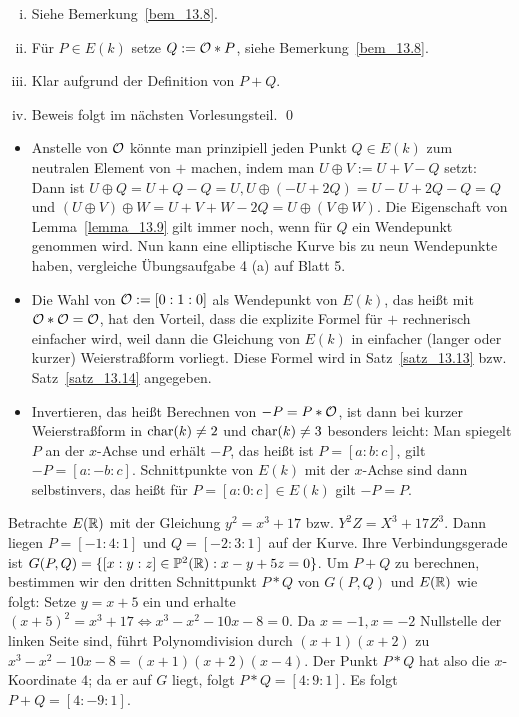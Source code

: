 	\begin{enumerate}[(i)]
		\item Siehe Bemerkung~\ref{bem_13.8}.
		\item Für $P \in E(k)$ setze $Q := \mathcal{O} * P$, siehe Bemerkung~\ref{bem_13.8}.
		\item Klar aufgrund der Definition von $P+Q$.
		\item Beweis folgt im nächsten Vorlesungsteil. \qed
	\end{enumerate}
	
\begin{bem}
	\begin{itemize}
		\item Anstelle von $\mathcal{O}$ könnte man prinzipiell jeden Punkt $Q \in E(k)$ zum neutralen Element von $+$ machen, indem man $U \oplus V := U + V - Q$ setzt: Dann ist $U \oplus Q = U + Q - Q = U, U \oplus(-U+2Q) = U-U+2Q-Q = Q$ und $(U \oplus V) \oplus W = U + V + W - 2Q = U \oplus (V \oplus W)$. 
		Die Eigenschaft von Lemma~\ref{lemma_13.9} gilt immer noch, wenn für $Q$ ein Wendepunkt genommen wird. 
		Nun kann eine elliptische Kurve bis zu neun Wendepunkte haben, vergleiche Übungsaufgabe 4 (a) auf Blatt 5.
		\item Die Wahl von $\mathcal{O} := [0:1:0]$ als Wendepunkt von $E(k)$, das heißt mit $\mathcal{O} * \mathcal{O} = \mathcal{O}$, hat den Vorteil, dass die explizite Formel für $+$ rechnerisch einfacher wird, weil dann die Gleichung von $E(k)$ in einfacher (langer oder kurzer) Weierstraßform vorliegt. 
		Diese Formel wird in Satz~\ref{satz_13.13} bzw. Satz~\ref{satz_13.14} angegeben.
		\item Invertieren, das heißt Berechnen von $-P = P * \mathcal{O}$, ist dann bei kurzer Weierstraßform in $\operatorname{char}(k) \neq 2$ und $\operatorname{char}(k) \neq 3$ besonders leicht: Man spiegelt $P$ an der $x$-Achse und erhält $-P$, das heißt ist $P = [a:b:c]$, gilt $-P = [a:-b:c]$. 
		Schnittpunkte von $E(k)$ mit der $x$-Achse sind dann selbstinvers, das heißt für $P = [a:0:c] \in E(k)$ gilt $-P = P$.
	\end{itemize}
\end{bem}

\begin{bsp}
	Betrachte $E(\mathbb{R})$ mit der Gleichung $y^2 = x^3 + 17$ bzw. $Y^2Z = X^3 + 17Z^3$. 
	Dann liegen $P = [-1:4:1]$ und $Q = [-2:3:1]$ auf der Kurve. 
	Ihre Verbindungsgerade ist $G(P,Q) = \{ [x:y:z] \in \mathbb{P}^2(\mathbb{R}) : x-y+5z = 0\}$. 
	Um $P+Q$ zu berechnen, bestimmen wir den dritten Schnittpunkt $P*Q$ von $G(P,Q)$ und $E(\mathbb{R})$ wie folgt: Setze $y = x + 5$ ein und erhalte $(x+5)^2 = x^3 + 17 \Leftrightarrow x^3 - x^2 - 10x - 8 = 0$. 
	Da $x = -1, x = -2$ Nullstelle der linken Seite sind, führt Polynomdivision durch $(x+1)(x+2)$ zu $x^3-x^2-10x-8 = (x+1)(x+2)(x-4)$. 
	Der Punkt $P * Q$ hat also die $x$-Koordinate $4$; da er auf $G$ liegt, folgt $P*Q = [4:9:1]$. 
	Es folgt $P + Q = [4:-9:1]$.
\end{bsp}

